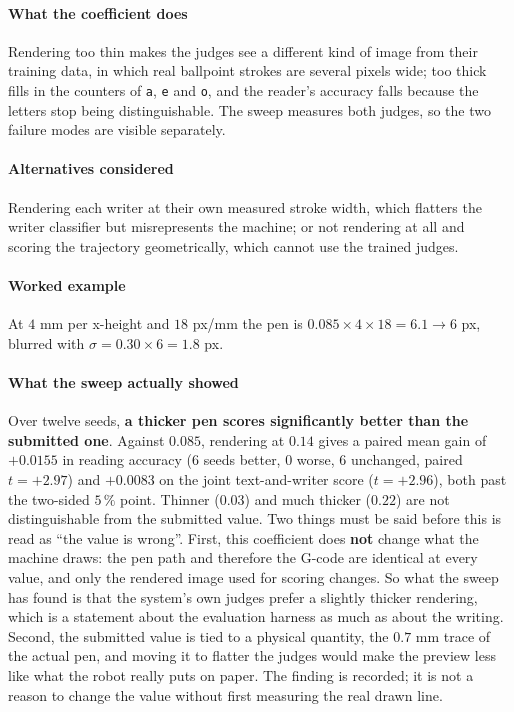 \paragraph{What the coefficient does}

Rendering too thin makes the judges see a different kind of image from their training data, in which real ballpoint strokes are several pixels wide; too thick fills in the counters of \texttt{a}, \texttt{e} and \texttt{o}, and the reader's accuracy falls because the letters stop being distinguishable. The sweep measures both judges, so the two failure modes are visible separately.

\paragraph{Alternatives considered}

Rendering each writer at their own measured stroke width, which flatters the writer classifier but misrepresents the machine; or not rendering at all and scoring the trajectory geometrically, which cannot use the trained judges.

\paragraph{Worked example}

At $4$ mm per x-height and $18$ px/mm the pen is $0.085 \times 4 \times 18 = 6.1 \to 6$ px, blurred with $\sigma = 0.30 \times 6 = 1.8$ px.

\paragraph{What the sweep actually showed}

Over twelve seeds, \textbf{a thicker pen scores significantly better than the submitted one}. Against $0.085$, rendering at $0.14$ gives a paired mean gain of $+0.0155$ in reading accuracy ($6$ seeds better, $0$ worse, $6$ unchanged, paired $t = +2.97$) and $+0.0083$ on the joint text-and-writer score ($t = +2.96$), both past the two-sided $5\,\%$ point. Thinner ($0.03$) and much thicker ($0.22$) are not distinguishable from the submitted value. Two things must be said before this is read as \enquote{the value is wrong}. First, this coefficient does \textbf{not} change what the machine draws: the pen path and therefore the G-code are identical at every value, and only the rendered image used for scoring changes. So what the sweep has found is that the system's own judges prefer a slightly thicker rendering, which is a statement about the evaluation harness as much as about the writing. Second, the submitted value is tied to a physical quantity, the $0.7$ mm trace of the actual pen, and moving it to flatter the judges would make the preview less like what the robot really puts on paper. The finding is recorded; it is not a reason to change the value without first measuring the real drawn line.

